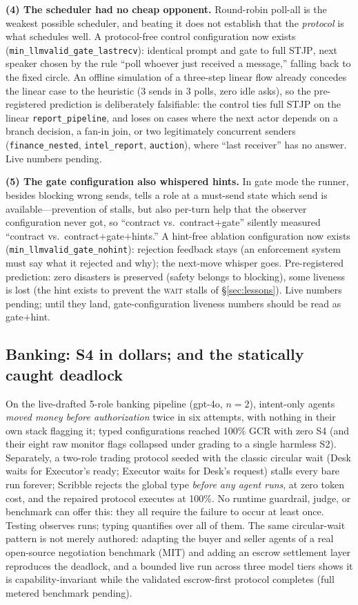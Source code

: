 \documentclass{article}
\newcommand{\stjp}{\textsc{STJP}}
\begin{document}
\textbf{(4) The scheduler had no cheap opponent.} Round-robin poll-all is the weakest possible scheduler, and beating it does not establish that the \emph{protocol} is what schedules well. A protocol-free control configuration now exists (\texttt{min\_llmvalid\_gate\_lastrecv}): identical prompt and gate to full \stjp{}, next speaker chosen by the rule ``poll whoever just received a message,'' falling back to the fixed circle. An offline simulation of a three-step linear flow already concedes the linear case to the heuristic (3 sends in 3 polls, zero idle asks), so the pre-registered prediction is deliberately falsifiable: the control ties full \stjp{} on the linear \texttt{report\_pipeline}, and loses on cases where the next actor depends on a branch decision, a fan-in join, or two legitimately concurrent senders (\texttt{finance\_nested}, \texttt{intel\_report}, \texttt{auction}), where ``last receiver'' has no answer. Live numbers pending.

\textbf{(5) The gate configuration also whispered hints.} In gate mode the runner, besides blocking wrong sends, tells a role at a must-send state which send is available---prevention of stalls, but also per-turn help that the observer configuration never got, so ``contract vs.\ contract$+$gate'' silently measured ``contract vs.\ contract$+$gate$+$hints.'' A hint-free ablation configuration now exists (\texttt{min\_llmvalid\_gate\_nohint}): rejection feedback stays (an enforcement system must say what it rejected and why); the next-move whisper goes. Pre-registered prediction: zero disasters is preserved (safety belongs to blocking), some liveness is lost (the hint exists to prevent the \textsc{wait} stalls of \S\ref{sec:lessons}). Live numbers pending; until they land, gate-configuration liveness numbers should be read as gate$+$hint.

\subsection{Banking: S4 in dollars; and the statically caught deadlock}
On the live-drafted 5-role banking pipeline (gpt-4o, $n{=}2$), intent-only agents \emph{moved money before authorization} twice in six attempts, with nothing in their own stack flagging it; typed configurations reached 100\% GCR with zero S4 (and their eight raw monitor flags collapsed under grading to a single harmless S2). Separately, a two-role trading protocol seeded with the classic circular wait (Desk waits for Executor's ready; Executor waits for Desk's request) stalls every bare run forever; Scribble rejects the global type \emph{before any agent runs}, at zero token cost, and the repaired protocol executes at 100\%. No runtime guardrail, judge, or benchmark can offer this: they all require the failure to occur at least once. Testing observes runs; typing quantifies over all of them. The same circular-wait pattern is not merely authored: adapting the buyer and seller agents of a real open-source negotiation benchmark \citep{agenticpay} (MIT) and adding an escrow settlement layer reproduces the deadlock, and a bounded live run across three model tiers shows it is capability-invariant while the validated escrow-first protocol completes (full metered benchmark pending).
\end{document}

